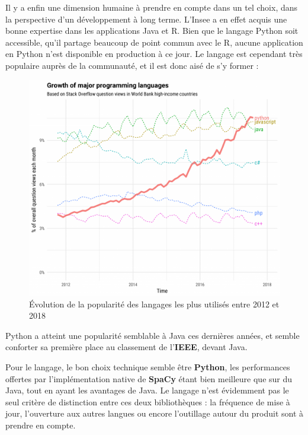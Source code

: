 Il y a enfin une dimension humaine à prendre en compte dans un tel choix, dans la perspective d'un développement à long terme. L'Insee a en effet acquis une bonne expertise dans les applications Java et R. Bien que le langage Python soit accessible, qu'il partage beaucoup de point commun avec le R, aucune application en Python n'est disponible en production à ce jour. Le langage est cependant très populaire auprès de la communauté, et il est donc aisé de s'y former :
\vspace{10pt}
\begin{figure}[H]
    \centering
    \includegraphics[scale=0.36]{images/languages-var.png}
    \caption{Évolution de la popularité des langages les plus utilisés entre 2012 et 2018}
    \label{fig:lang-var}
\end{figure}
\vspace{5pt}
Python a atteint une popularité semblable à Java ces dernières années, et semble conforter sa première place au classement de l'\textbf{IEEE}, devant Java.

Pour le langage, le bon choix technique semble être \textbf{Python}, les performances offertes par l'implémentation native de \textbf{SpaCy} étant bien meilleure que sur du Java, tout en ayant les avantages de Java. Le langage n'est évidemment pas le seul critère de distinction entre ces deux bibliothèques : la fréquence de mise à jour, l'ouverture aux autres langues ou encore l'outillage autour du produit sont à prendre en compte.
\label{section 3.1.1}

